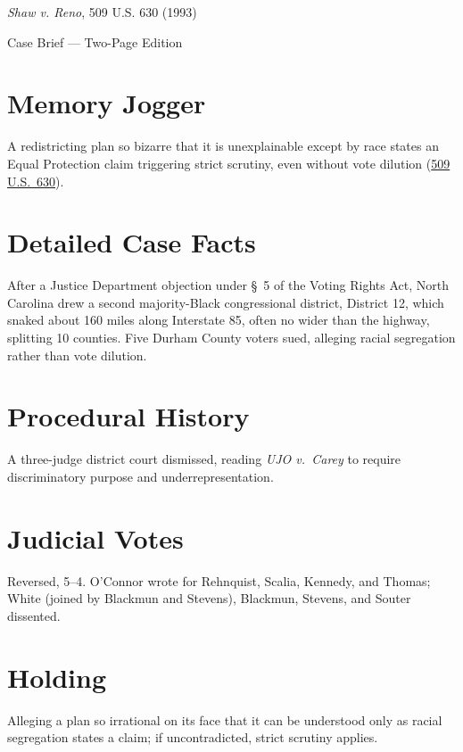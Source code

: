 \documentclass[12pt]{article}
\begin{document}
\begin{center}
{\LARGE \textit{Shaw v. Reno}, 509 U.S. 630 (1993)\par}
\vspace{0.5em}
{\large Case Brief --- Two-Page Edition\par}
\end{center}

\section{Memory Jogger}
A redistricting plan so bizarre that it is unexplainable except by race states an Equal Protection claim triggering strict scrutiny, even without vote dilution (\href{https://supreme.justia.com/cases/federal/us/509/630/}{509 U.S.\ 630}).

\section{Detailed Case Facts}
After a Justice Department objection under \S\ 5 of the Voting Rights Act, North Carolina drew a second majority-Black congressional district, District 12, which snaked about 160 miles along Interstate 85, often no wider than the highway, splitting 10 counties. Five Durham County voters sued, alleging racial segregation rather than vote dilution.

\section{Procedural History}
A three-judge district court dismissed, reading \textit{UJO v.\ Carey} to require discriminatory purpose and underrepresentation.

\section{Judicial Votes}
Reversed, 5--4. O'Connor wrote for Rehnquist, Scalia, Kennedy, and Thomas; White (joined by Blackmun and Stevens), Blackmun, Stevens, and Souter dissented.

\section{Holding}
Alleging a plan so irrational on its face that it can be understood only as racial segregation states a claim; if uncontradicted, strict scrutiny applies.
\end{document}
